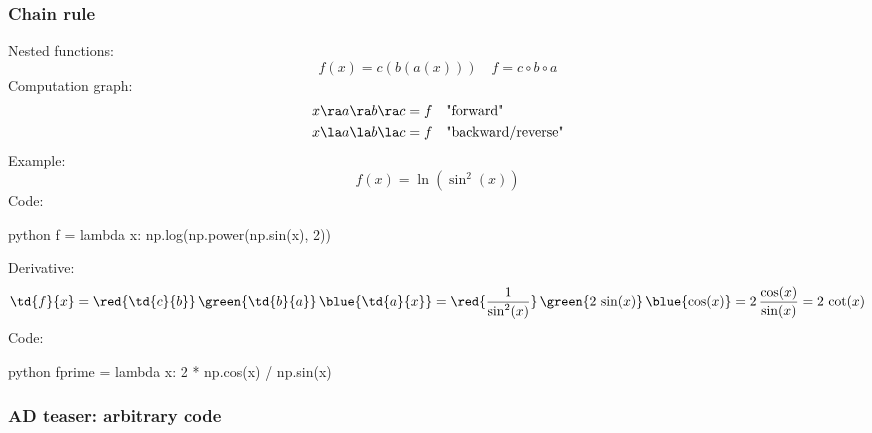 \documentclass[fleqn,10pt]{beamer}
\begin{document}
\begin{frame}[fragile]
    \frametitle{Chain rule}
    Nested functions:
    \begin{equation*}
        f(x) = c(b(a(x)))\quad f = c \circ b \circ a
    \end{equation*}
    Computation graph:
    \begin{align*}
        x\ra a\ra b\ra c &= f\quad\text{"forward"}\\
        x\la a\la b\la c &= f\quad\text{"backward/reverse"}
    \end{align*}
    Example:
    \begin{equation*}
        f(x) = \ln(\sin^2(x))
    \end{equation*}
    Code:
    \begin{mintedcode}{python}
    f = lambda x: np.log(np.power(np.sin(x), 2))
    \end{mintedcode}
    Derivative:
    \begin{equation*}
        \td{f}{x} = \red{\td{c}{b}}\,\green{\td{b}{a}}\,\blue{\td{a}{x}}
            = \red{\frac{1}{\sin^2(x)}}\,\green{2\,\sin(x)}\,\blue{\cos(x)}
            = 2\,\frac{\cos(x)}{\sin(x)} = 2\,\cot(x)
    \end{equation*}
    Code:
    \begin{mintedcode}{python}
    fprime = lambda x: 2 * np.cos(x) / np.sin(x)
    \end{mintedcode}
\end{frame}


\begin{frame}
    \frametitle{AD teaser: arbitrary code}
    \vspace{-0.3cm}
\end{frame}
\end{document}
